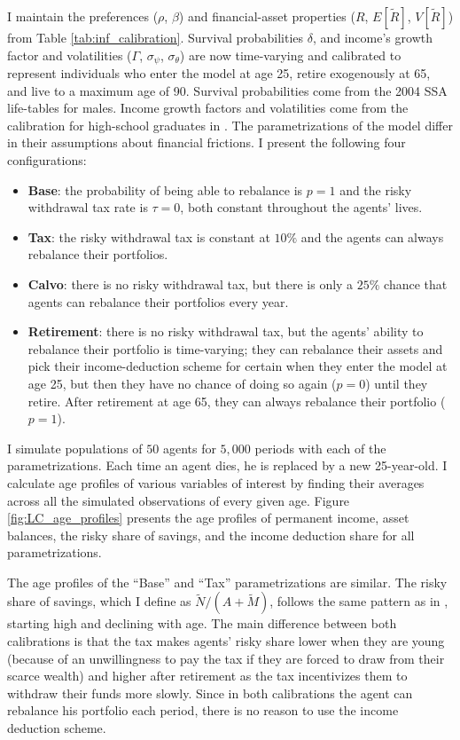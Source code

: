 \documentclass[./RiskyContrib.tex]{subfiles}
\begin{document}
I maintain the preferences ($\rho$, $\beta$) and financial-asset properties
($R$, $E[\tilde{R}]$, $V[\tilde{R}]$) from Table \ref{tab:inf_calibration}.
Survival probabilities $\delta$, and income's growth factor and volatilities
($\Gamma$, $\sigma_{\psi}$, $\sigma_{\theta}$) are now time-varying and
calibrated to represent  individuals who enter the model at age 25,
retire exogenously at 65, and live to a maximum age of 90. Survival
probabilities come from the 2004 SSA life-tables for males. Income growth
factors and volatilities come from the calibration for high-school graduates
in \cite{Cagetti2003jbes}. The parametrizations of the model differ in their
assumptions about financial frictions. I present the following four configurations:
\begin{itemize}
\item \textbf{Base}: the probability of being able to rebalance is $p = 1$
and the risky withdrawal tax rate is $\tau = 0$, both constant throughout the agents' lives.
\item \textbf{Tax}: the risky withdrawal tax is constant at $10\%$ and the agents
can always rebalance their portfolios.
\item \textbf{Calvo}: there is no risky withdrawal tax, but there is only a $25\%$ chance
that agents can rebalance their portfolios every year.
\item \textbf{Retirement}: there is no risky withdrawal tax, but the agents' ability
to rebalance their portfolio is time-varying; they can rebalance their assets and pick
their income-deduction scheme for certain when they enter the model at age 25, but
then they have no chance of doing so again ($p=0$) until they retire. After retirement
at age 65, they can always rebalance their portfolio ($p=1$).
\end{itemize}




I simulate populations of $50$ agents for $5,000$ periods with each of the
parametrizations. Each time an agent dies, he is replaced by a new 25-year-old.
I calculate age profiles of various variables of interest by finding their
averages across all the simulated observations of every given age. Figure 
\ref{fig:LC_age_profiles} presents the age profiles of permanent income,
asset balances, the risky share of savings, and the income deduction share
for all parametrizations.

The age profiles of the ``Base'' and ``Tax'' parametrizations are similar.
The risky share of savings, which I define as $\tilde{N}/(A + \tilde{M})$,
follows the same pattern as in \cite{Cocco2005rfs}, starting high and declining
with age. The main difference between both calibrations is that the tax
makes agents' risky share lower when they are young (because of an unwillingness
to pay the tax if they are forced to draw from their scarce wealth) and higher
after retirement as the tax incentivizes them to withdraw their funds more slowly.
Since in both calibrations the agent can rebalance his portfolio each period, there
is no reason to use the income deduction scheme.
\end{document}
